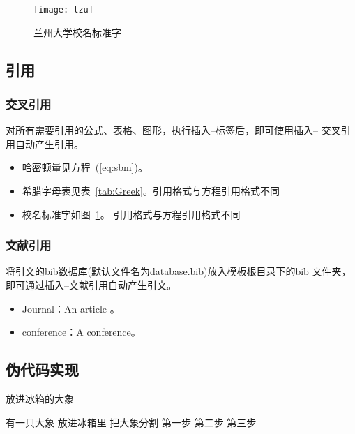 \documentclass{LZUthesis}
\begin{document}
\begin{figure}[H]
\begin{centering}
\texttt{[image: lzu]}\\
\end{centering}
\protect\caption{兰州大学校名标准字\label{fig:lzu}}
\end{figure}

\subsection{引用}
\subsubsection{交叉引用}

对所有需要引用的公式、表格、图形，执行插入--标签后，即可使用插入-- 交叉引用自动产生引用。
\begin{itemize}
\item 哈密顿量见方程~(\ref{eq:sbm})。
\item 希腊字母表见表~\ref{tab:Greek}。引用格式与方程引用格式不同
\item 校名标准字如图~\ref{fig:lzu}。 引用格式与方程引用格式不同
\end{itemize}


\subsubsection{文献引用}

将引文的bib数据库(默认文件名为database.bib)放入模板根目录下的bib 文件夹，即可通过插入--文献引用自动产生引文。
\begin{itemize}
\item Journal：An article \cite{partl2016}。
\item conference：A conference\cite{tussyadiah2015hotels}。
\end{itemize}

\subsection{伪代码实现}

\begin{algorithm}
  \caption{放进冰箱的大象}
  \label{算法实例}
  \begin{algorithmic}
  \REQUIRE 有一只大象
  \ENSURE 放进冰箱里
     \STATE 把大象分割
        \ENDIF
    \ENDFOR
   \STATE 第一步
  \STATE 第二步
  \STATE 第三步
  \end{algorithmic}
\end{algorithm}
\end{document}

